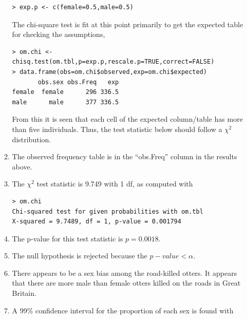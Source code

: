 \documentclass[10pt,openany]{book}\usepackage[]{graphicx}\usepackage[]{color}
\makeatletter
\newenvironment{kframe}{%
 \def\at@end@of@kframe{}%
 \ifinner\ifhmode%
  \def\at@end@of@kframe{\end{minipage}}%
  \begin{minipage}{\columnwidth}%
 \fi\fi%
 \def\FrameCommand##1{\hskip\@totalleftmargin \hskip-\fboxsep
 \colorbox{shadecolor}{##1}\hskip-\fboxsep
     \hskip-\linewidth \hskip-\@totalleftmargin \hskip\columnwidth}%
 \MakeFramed {\advance\hsize-\width
   \@totalleftmargin\z@ \linewidth\hsize
   \@setminipage}}%
 {\par\unskip\endMakeFramed%
 \at@end@of@kframe}
\newenvironment{knitrout}{}{} %
\makeatother
\begin{document}
\begin{itemize}
\begin{enumerate}
\begin{knitrout}
\color{fgcolor}\begin{kframe}
\begin{verbatim}
> exp.p <- c(female=0.5,male=0.5)
\end{verbatim}
\end{kframe}
\end{knitrout}
The chi-square test is fit at this point primarily to get the expected table for checking the assumptions,
\begin{knitrout}
\color{fgcolor}\begin{kframe}
\begin{verbatim}
> om.chi <- chisq.test(om.tbl,p=exp.p,rescale.p=TRUE,correct=FALSE)
> data.frame(obs=om.chi$observed,exp=om.chi$expected)
       obs.sex obs.Freq   exp
female  female      296 336.5
male      male      377 336.5
\end{verbatim}
\end{kframe}
\end{knitrout}
From this it is seen that each cell of the expected column/table has more than five individuals.  Thus, the test statistic below should follow a $\chi^{2}$ distribution.
      \item The observed frequency table is in the ``obs.Freq'' column in the results above.
      \item The $\chi^{2}$ test statistic is 9.749 with 1 df, as computed with
\begin{knitrout}
\color{fgcolor}\begin{kframe}
\begin{verbatim}
> om.chi
Chi-squared test for given probabilities with om.tbl 
X-squared = 9.7489, df = 1, p-value = 0.001794
\end{verbatim}
\end{kframe}
\end{knitrout}
      \item The p-value for this test statistic is $p=0.0018$.
      \item The null hypothesis is rejected because the $p-value<\alpha$.
      \item There appears to be a sex bias among the road-killed otters.  It appears that there are more male than female otters killed on the roads in Great Britain.
      \item A 99\% confidence interval for the proportion of each sex is found with

\end{enumerate}
\end{itemize}
\end{document}
